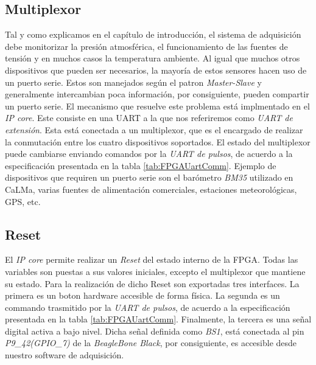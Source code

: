 	\subsection{Multiplexor}
		Tal y como explicamos en el capítulo de introducción, el sistema de adquisición debe monitorizar la presión atmosférica, el
		funcionamiento de las fuentes de tensión y en muchos casos la temperatura ambiente. Al igual que muchos otros dispositivos que pueden
		ser necesarios, la mayoría de estos sensores hacen uso de un puerto serie. Estos son manejados según el patron \emph{Master-Slave} y
		generalmente intercambian poca información, por consiguiente, pueden compartir un puerto serie. El mecanismo que resuelve este
		problema está implmentado en el \emph{IP core}. Este consiste en una UART a la que nos referiremos como \emph{UART de extensión}. Esta
		está conectada a un multiplexor, que es el encargado de realizar la conmutación entre los cuatro dispositivos soportados. El estado
		del multiplexor puede cambiarse enviando comandos por la \emph{UART de pulsos}, de acuerdo a la especificación presentada en la tabla
		\ref{tab:FPGAUartComm}. Ejemplo de dispositivos que requiren un puerto serie son el barómetro \emph{BM35} utilizado en CaLMa, varias
		fuentes de alimentación comerciales, estaciones meteorológicas, GPS, etc.
	\subsection{Reset}
		\enlargethispage{2\baselineskip}
		El \emph{IP core} permite realizar un \emph{Reset} del estado interno de la FPGA. Todas las variables son puestas a sus valores iniciales,
		excepto el multiplexor que mantiene su estado. Para la realización de dicho Reset son exportadas tres interfaces. La primera es un
		boton hardware accesible de forma física. La segunda es un commando trasmitido por la \emph{UART de pulsos}, de acuerdo a la
		especificación presentada en la tabla \ref{tab:FPGAUartComm}. Finalmente, la tercera es una señal digital activa a bajo nivel. Dicha
		señal definida como \emph{BS1}, está conectada al pin \emph{P9\_42(GPIO\_7)} de la \emph{BeagleBone Black}, por consiguiente, es accesible
		desde nuestro software de adquisición.
